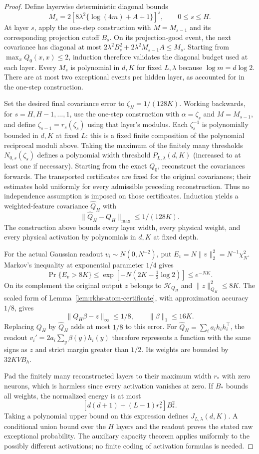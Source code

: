 \begin{proof}
Define layerwise deterministic diagonal bounds
\[
 M_s=2[8\lambda^2\{\log(4m)+A+1\}]^s,\qquad 0\le s\le H.
\]
At layer $s$, apply the one-step construction with $M=M_{s-1}$ and
its corresponding projection cutoff $B_s$. On its projection-good event,
the next covariance has diagonal at most
$2\lambda^2B_s^2+2\lambda^2M_{s-1}A\le M_s$. Starting from
$\max_xQ_0(x,x)\le2$, induction therefore validates the diagonal budget
used at each layer. Every $M_s$ is polynomial in $d,K$ for fixed
$L,\lambda$ because $\log m=d\log2$. There are at most two
exceptional events per hidden layer, as accounted for in the one-step
construction.

Set the desired final covariance error to $\zeta_H=1/(128K)$.
Working backwards, for $s=H,H-1,\ldots,1$, use the one-step construction
with $\alpha=\zeta_s$ and $M=M_{s-1}$, and define
$\zeta_{s-1}=r_s(\zeta_s)$ using that layer's modulus.
Each $\zeta_s^{-1}$ is polynomially bounded in $d,K$ at fixed $L$:
this is a fixed finite composition of the polynomial reciprocal moduli
above. Taking the maximum of the finitely many thresholds
$N_{0,s}(\zeta_s)$ defines a polynomial width threshold
$P_{L,\lambda}(d,K)$ (increased to at least one if necessary).
Starting from the exact $Q_0$, reconstruct the covariances forwards.
The transported certificates are fixed for the original covariances;
their estimates hold uniformly for every admissible preceding
reconstruction. Thus no independence assumption is imposed on those
certificates. Induction yields a weighted-feature covariance
$\widehat Q_H$ with
\[
 \|\widehat Q_H-Q_H\|_{\max}\le1/(128K).
\]
The construction above bounds every layer width, every physical weight,
and every physical activation by polynomials in $d,K$ at fixed depth.

For the actual Gaussian readout $v_i\sim N(0,N^{-2})$, put
$E_v=N\|v\|_2^2=N^{-1}\chi_N^2$. Markov's inequality at exponential
parameter $1/4$ gives
\[
 \Pr\{E_v>8K\}\le\exp[-N(2K-\tfrac12\log2)]\le e^{-NK}.
\]
On its complement the original output $z$ belongs to $\mathcal H_{Q_H}$
and $\|z\|_{Q_H}^2\le8K$. The scaled form of
Lemma~\ref{lem:rkhs-atom-certificate}, with approximation accuracy $1/8$,
gives
\[
 \|Q_H\beta-z\|_\infty\le1/8,\qquad \|\beta\|_1\le16K.
\]
Replacing $Q_H$ by $\widehat Q_H$ adds at most $1/8$ to this error.
For $\widehat Q_H=\sum_i a_i h_ih_i^\top$, the readout
$v_i'=2a_i\sum_y\beta(y)h_i(y)$ therefore represents a function with
the same signs as $z$ and strict margin greater than $1/2$.
Its weights are bounded by $32KVB_h$.

Pad the finitely many reconstructed layers to their maximum width $r_*$
with zero neurons, which is harmless since every activation vanishes at
zero. If $B_*$ bounds all weights, the normalized energy is at most
\[
 [d(d+1)+(L-1)r_*^2]B_*^2.
\]
Taking a polynomial upper bound on this expression defines
$J_{L,\lambda}(d,K)$. A conditional union bound over the $H$ layers and
the readout proves the stated raw exceptional probability. The auxiliary
capacity theorem applies uniformly to the possibly different activations;
no finite coding of activation formulas is needed.
\end{proof}
